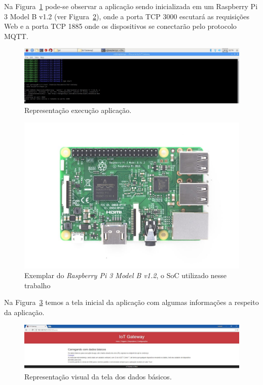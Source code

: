 Na Figura~\ref{fig:raspberryDistroRaspbian} pode-se observar a aplicação sendo inicializada em um Raspberry Pi 3 Model B v1.2 (ver Figura~\ref{fig:raspberryPi3ModelB}), onde a porta TCP 3000 escutará as requisições Web e a porta TCP 1885 onde os dispositivos se conectarão pelo protocolo MQTT.
\begin{figure}[h!]
	\begin{center}
		\includegraphics[width=1.085\textwidth]{./img/raspberryDistroRaspbian}
		\caption{Representação execução aplicação.}
		\label{fig:raspberryDistroRaspbian}
	\end{center}
\end{figure}

\begin{figure}[h!]
	\begin{center}
		\includegraphics[width=1.085\textwidth]{./img/raspberry-pi-3}
		\caption{Exemplar do \textit{Raspberry Pi 3 Model B v1.2}, o SoC utilizado nesse trabalho}
		\label{fig:raspberryPi3ModelB}
	\end{center}
\end{figure}

Na Figura~\ref{fig:dadosBasicos} temos a tela inicial da aplicação com algumas informações a respeito da aplicação.
\begin{figure}[h!]
	\begin{center}
		\includegraphics[width=1.085\textwidth]{./img/dadosBasicos}
		\caption{Representação visual da tela dos dados básicos.}
		\label{fig:dadosBasicos}
	\end{center}
\end{figure}

